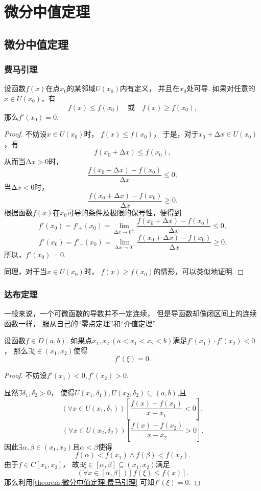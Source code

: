 \chapter{微分中值定理}
\section{微分中值定理}
\subsection{费马引理}
\begin{lemma}[费马引理]\label{theorem:微分中值定理.费马引理}
设函数\(f(x)\)在点\(x_0\)的某邻域\(U(x_0)\)内有定义，
并且在\(x_0\)处可导.
如果对任意的\(x \in U(x_0)\)，有
\[
    f(x) \leq f(x_0)
    \quad\text{或}\quad
    f(x) \geq f(x_0),
\]
那么\(f'(x_0) = 0\).
\begin{proof}
不妨设\(x \in U(x_0)\)时，
\(f(x) \leq f(x_0)\)，
于是，对于\(x_0 + \increment x \in U(x_0)\)，有\[
    f(x_0 + \increment x) \leq f(x_0),
\]
从而当\(\increment x > 0\)时，\[
    \frac{f(x_0 + \increment x) - f(x_0)}{\increment x} \leq 0;
\]
当\(\increment x < 0\)时，\[
    \frac{f(x_0 + \increment x) - f(x_0)}{\increment x} \geq 0.
\]
根据函数\(f(x)\)在\(x_0\)可导的条件及极限的保号性，便得到\[
    f'(x_0) = f'_+(x_0)
    = \lim\limits_{\increment x\to0^+}
    \frac{f(x_0 + \increment x) - f(x_0)}{\increment x} \leq 0,
\]\[
    f'(x_0) = f'_-(x_0)
    = \lim\limits_{\increment x\to0^-}
    \frac{f(x_0 + \increment x) - f(x_0)}{\increment x} \geq 0.
\]
所以，\(f'(x_0) = 0\).

同理，对于当\(x \in U(x_0)\)时，
\(f(x) \geq f(x_0)\)的情形，可以类似地证明.
\end{proof}
\end{lemma}

\subsection{达布定理}
一般来说，一个可微函数的导数并不一定连续，
但是导函数却像闭区间上的连续函数一样，
服从自己的“零点定理”和“介值定理”.

\begin{theorem}[达布零点定理]\label{theorem:微分中值定理.达布定理1}
设函数\(f \in D(a,b)\).
如果点\(x_1,x_2\ (a<x_1<x_2<b)\)满足\(f'(x_1) \cdot f'(x_2) < 0\)，
那么\(\exists\xi\in(x_1,x_2)\)使得\[
	f'(\xi) = 0.
\]
\begin{proof}
不妨设\(f'(x_1)<0,f'(x_2)>0\).

显然\(\exists\delta_1,\delta_2>0\)，
使得\(U(x_1,\delta_1),U(x_2,\delta_2)\subseteq(a,b)\),且\[
	(\forall x \in U(x_1,\delta_1))
	\left[\frac{f(x)-f(x_1)}{x-x_1}<0\right],
\]\[
	(\forall x \in U(x_2,\delta_2))
	\left[\frac{f(x)-f(x_2)}{x-x_2}>0\right].
\]
因此\(\exists\alpha,\beta\in(x_1,x_2)\)且\(\alpha<\beta\)使得\[
	f(\alpha)<f(x_1) \land f(\beta)<f(x_2).
\]
由于\(f \in C[x_1,x_2]\)，
故\(\exists\xi\in[\alpha,\beta]\subseteq(x_1,x_2)\)满足\[
	(\forall x\in[\alpha,\beta])
	[f(\xi) \leq f(x)].
\]
那么利用\cref{theorem:微分中值定理.费马引理} 可知\(f'(\xi)=0\).
\end{proof}
\end{theorem}

